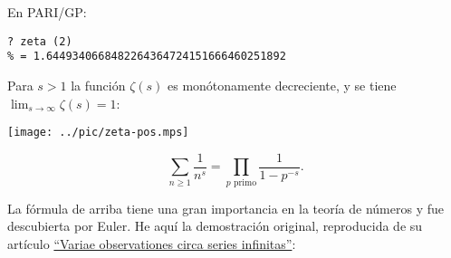 \documentclass{article}
\begin{document}
\begin{shaded}
\noindent\small En PARI/GP:

\begin{verbatim}
? zeta (2)
% = 1.6449340668482264364724151666460251892
\end{verbatim}
\end{shaded}

Para $s > 1$ la función $\zeta (s)$ es monótonamente decreciente, y se tiene $\lim_{s\to \infty} \zeta (s) = 1$:

\begin{center}
\texttt{[image: ../pic/zeta-pos.mps]}
\end{center}

\begin{teorema*}
$$\sum_{n \ge 1} \frac{1}{n^s} = \prod_{p\text{ primo}} \frac{1}{1 - p^{-s}}.$$
\end{teorema*}

La fórmula de arriba tiene una gran importancia en la teoría de números y fue descubierta por Euler. He aquí la demostración original, reproducida de su artículo \href{http://eulerarchive.maa.org/pages/E072.html}{``Variae observationes circa series infinitas''}:
\end{document}
